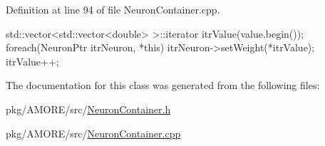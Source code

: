 Definition at line 94 of file NeuronContainer.cpp.


\begin{DoxyCode}
{
  std::vector<std::vector<double> >::iterator itrValue(value.begin());
foreach(NeuronPtr itrNeuron, *this)
  {
    itrNeuron->setWeight(*itrValue);
    itrValue++;
  }
}
\end{DoxyCode}


The documentation for this class was generated from the following files:\begin{DoxyCompactItemize}
\item 
pkg/AMORE/src/\hyperlink{_neuron_container_8h}{NeuronContainer.h}\item 
pkg/AMORE/src/\hyperlink{_neuron_container_8cpp}{NeuronContainer.cpp}\end{DoxyCompactItemize}
